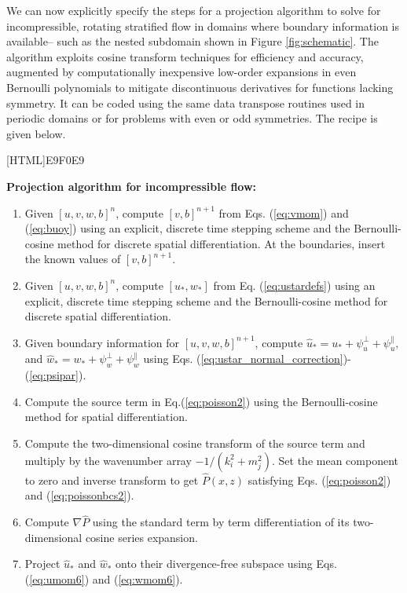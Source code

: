 \documentclass{jfm-like}
\begin{document}
\vspace{14pt}
We can now explicitly specify the steps for a projection algorithm to solve for incompressible, rotating stratified flow in domains where boundary information is available-- such as the nested subdomain shown in
Figure \ref{fig:schematic}. The algorithm exploits cosine transform techniques for efficiency and accuracy, augmented by computationally inexpensive low-order expansions in even Bernoulli polynomials to mitigate
discontinuous derivatives for functions lacking symmetry.  It can be coded using the same data transpose routines used in periodic domains or for problems with even or odd symmetries.
The recipe is given below.
\vspace{14pt}

[HTML]{E9F0E9}{\parbox{\textwidth}{%
\noindent \textbf{Projection algorithm for incompressible flow:}
\vspace{14pt}
\begin{enumerate}
\setlength\itemsep{1em}
\item Given $[u,v,w,b]^{n}$, compute $[v,b]^{n+1}$ from Eqs. (\ref{eq:vmom}) and (\ref{eq:buoy}) using an explicit, discrete time stepping scheme and the Bernoulli-cosine method for discrete spatial differentiation.
At the boundaries, insert the known values of  $[v,b]^{n+1}$.
\item Given $[u,v,w,b]^{n}$, compute $[u_*,w_*]$ from Eq. (\ref{eq:ustardefs}) using an explicit, discrete time stepping scheme and the Bernoulli-cosine method for discrete spatial differentiation.
\item Given boundary information for $[u,v,w,b]^{n+1}$, compute ${\hat u}_* = u_* + \psi^\perp_u +  \psi^\parallel_u,$ and ${\hat w}_* = w_* + \psi^\perp_w +  \psi^\parallel_w$ using 
Eqs. (\ref{eq:ustar_normal_correction})-(\ref{eq:psipar}).
\item Compute the source term in Eq.(\ref{eq:poisson2}) using the Bernoulli-cosine method for spatial differentiation.
\item Compute the two-dimensional cosine transform of the source term and multiply by the wavenumber array $-1/(k_i^2 + m_j^2)$. Set the mean component to zero and inverse transform to get ${\hat P}(x,z)$ satisfying
Eqs. (\ref{eq:poisson2}) and  (\ref{eq:poissonbcs2}).
\item Compute $\nabla {\hat P}$ using the standard term by term differentiation of its two-dimensional cosine series expansion.
\item Project ${\hat u}_*$ and ${\hat w}_*$ onto their divergence-free subspace using Eqs. (\ref{eq:umom6}) and (\ref{eq:wmom6}).
\end{enumerate}
\vspace{14pt}
}}
\end{document}
